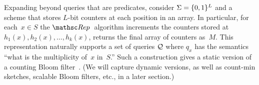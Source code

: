 Expanding beyond queries that are predicates, consider $\Sigma=\{0,1\}^L$ and a scheme that stores $L$-bit counters at each position in an array.  In particular, for each~$x \in S$ the $\Rep$~algorithm increments the counters stored at $h_1(x),h_2(x),\ldots,h_k(x)$, returns the final array of counters as~$M$.  This representation naturally supports a set of queries ${\cal Q}$ where $q_x$ has the semantics ``what is the multiplicity of~$x$ in~$S$.''   Such a construction gives a static version of a counting Bloom filter~\cite{xxx}.  (We will capture dynamic versions, as well as count-min sketches, scalable Bloom filters, etc., in a later section.)

